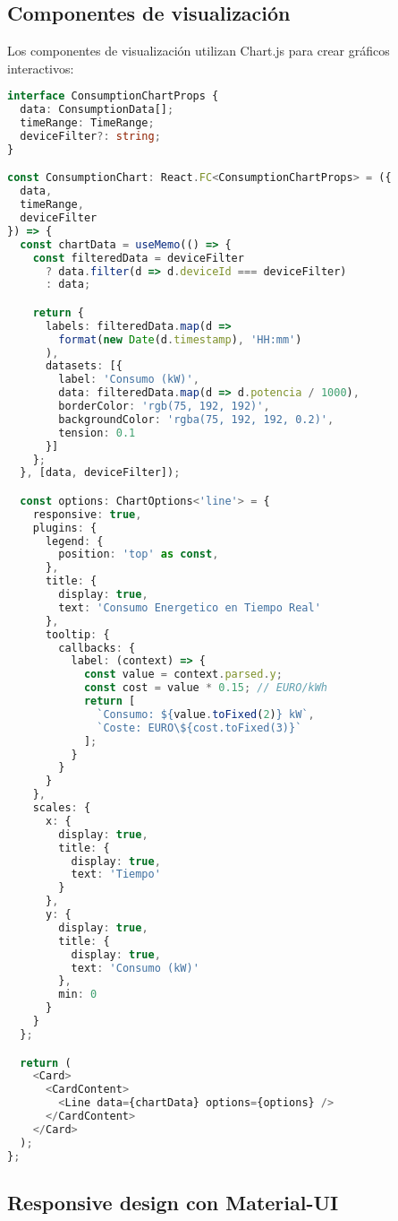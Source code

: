 \subsection{Componentes de visualización}

Los componentes de visualización utilizan Chart.js para crear gráficos interactivos:

\begin{lstlisting}[language=TypeScript, caption=Componente de gráfico de consumo]
interface ConsumptionChartProps {
  data: ConsumptionData[];
  timeRange: TimeRange;
  deviceFilter?: string;
}

const ConsumptionChart: React.FC<ConsumptionChartProps> = ({
  data,
  timeRange,
  deviceFilter
}) => {
  const chartData = useMemo(() => {
    const filteredData = deviceFilter 
      ? data.filter(d => d.deviceId === deviceFilter)
      : data;

    return {
      labels: filteredData.map(d => 
        format(new Date(d.timestamp), 'HH:mm')
      ),
      datasets: [{
        label: 'Consumo (kW)',
        data: filteredData.map(d => d.potencia / 1000),
        borderColor: 'rgb(75, 192, 192)',
        backgroundColor: 'rgba(75, 192, 192, 0.2)',
        tension: 0.1
      }]
    };
  }, [data, deviceFilter]);

  const options: ChartOptions<'line'> = {
    responsive: true,
    plugins: {
      legend: {
        position: 'top' as const,
      },
      title: {
        display: true,
        text: 'Consumo Energetico en Tiempo Real'
      },
      tooltip: {
        callbacks: {
          label: (context) => {
            const value = context.parsed.y;
            const cost = value * 0.15; // EURO/kWh
            return [
              `Consumo: ${value.toFixed(2)} kW`,
              `Coste: EURO\${cost.toFixed(3)}`
            ];
          }
        }
      }
    },
    scales: {
      x: {
        display: true,
        title: {
          display: true,
          text: 'Tiempo'
        }
      },
      y: {
        display: true,
        title: {
          display: true,
          text: 'Consumo (kW)'
        },
        min: 0
      }
    }
  };

  return (
    <Card>
      <CardContent>
        <Line data={chartData} options={options} />
      </CardContent>
    </Card>
  );
};
\end{lstlisting}

\subsection{Responsive design con Material-UI}

